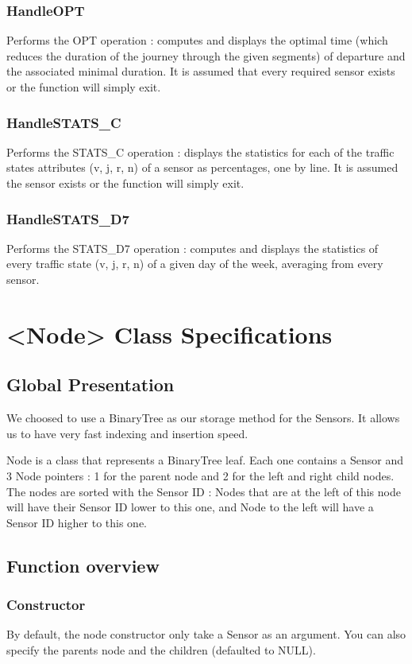 \documentclass[10pt]{article}
\begin{document}
\subsubsection*{HandleOPT}
Performs the OPT operation : computes and displays the optimal time (which reduces the duration of the journey through the given segments) of departure and the associated minimal duration. It is assumed that every required sensor exists or the function will simply exit.

\subsubsection*{HandleSTATS\_C}
Performs the STATS\_C operation : displays the statistics for each of the traffic states attributes (v, j, r, n) of a sensor as percentages, one by line. It is assumed the sensor exists or the function will simply exit.

\subsubsection*{HandleSTATS\_D7}
Performs the STATS\_D7 operation : computes and displays the statistics of every traffic state (v, j, r, n) of a given day of the week, averaging from every sensor.

\section{<Node> Class Specifications}
\subsection{Global Presentation}
We choosed to use a BinaryTree as our storage method for the Sensors. It allows us to have very fast indexing and insertion speed.

Node is a class that represents a BinaryTree leaf. Each one contains a Sensor and 3 Node pointers : 1 for the parent node and 2 for the left and right child nodes. The nodes are sorted with the Sensor ID : Nodes that are at the left of this node will have their Sensor ID lower to this one, and Node to the left will have a Sensor ID higher to this one.
\subsection{Function overview}
\subsubsection*{Constructor}
By default, the node constructor only take a Sensor as an argument. You can also specify the parents node and the children (defaulted to NULL).
\end{document}
